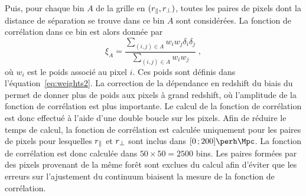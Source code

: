 \documentclass[11pt, twoside, a4paper, openright]{report}
\begin{document}
Puis, pour chaque bin $A$ de la grille en $(r_{\parallel}{}, r_{\perp}{})$, toutes les paires de pixels dont la distance de séparation se trouve dans ce bin $A$ sont considérées. La fonction de corrélation dans ce bin est alors donnée par
\begin{equation}
  \label{eq:xiff}
  \xi_A = \frac{
    \sum\limits_{(i,j)\in A} w_i w_j \delta_i \delta_j
  }{
    \sum\limits_{(i,j)\in A} w_i w_j
  }
  \; ,
\end{equation}
où $w_i$ est le poids associé au pixel $i$. Ces poids sont définis dans l'équation~\ref{eq:weights2}. La correction de la dépendance en redshift du biais du \lya{} permet de donner plus de poids aux pixels à grand redshift, où l'amplitude de la fonction de corrélation est plus importante.
Le calcul de la fonction de corrélation est donc effectué à l'aide d'une double boucle sur les pixels.
Afin de réduire le temps de calcul, la fonction de corrélation est calculée uniquement pour les paires de pixels pour lesquelles $r_{\parallel}{}$ et $r_{\perp}{}$ sont inclus dans $[0 \, ; 200] \si{\perh\Mpc}$. La fonction de corrélation est donc calculée dans $50 \times 50 = \num{2500}$ bins.
Les paires formées par des pixels provenant de la même forêt sont exclues du calcul afin d'éviter que les erreurs sur l'ajustement du continuum biaisent la mesure de la fonction de corrélation.
\end{document}

